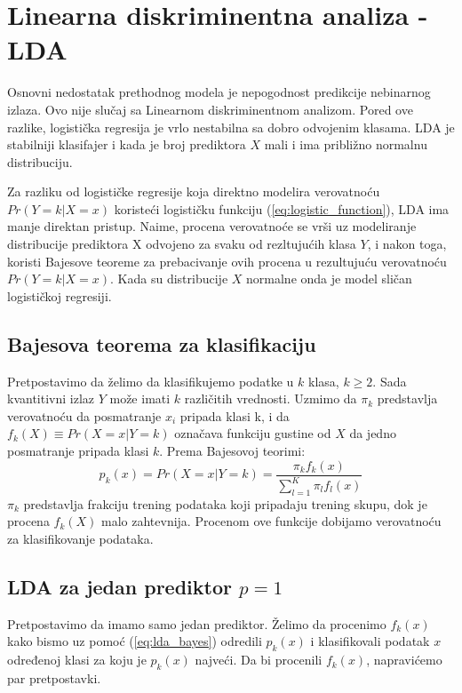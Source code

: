 \section{Linearna diskriminentna analiza - LDA}
Osnovni nedostatak prethodnog modela je nepogodnost predikcije nebinarnog izlaza.
Ovo nije slučaj sa Linearnom diskriminentnom analizom. Pored ove razlike,
logistička regresija je vrlo nestabilna sa dobro odvojenim klasama. LDA je
stabilniji klasifajer i kada je broj prediktora $X$ mali i ima približno normalnu
distribuciju.

Za razliku od logističke regresije koja direktno modelira verovatnoću $Pr\left(Y=k | X = x\right)$
koristeći logističku funkciju (\ref{eq:logistic_function}), LDA ima manje
direktan pristup. Naime, procena
verovatnoće se vrši uz modeliranje distribucije prediktora X odvojeno za svaku
od rezltujućih klasa $Y$, i nakon toga, koristi Bajesove teoreme za
prebacivanje ovih procena u rezultujuću verovatnoću $Pr\left(Y=k | X = x\right)$.
Kada su distribucije $X$ normalne onda je model sličan logističkoj regresiji.

\subsection{Bajesova teorema za klasifikaciju}
Pretpostavimo da želimo da klasifikujemo podatke u $k$ klasa, $k \geq 2$. Sada
kvantitivni izlaz $Y$ može imati $k$ različitih vrednosti. Uzmimo da $\pi_k$
predstavlja verovatnoću da posmatranje $x_i$ pripada klasi k, i da
$f_k\left(X\right) \equiv Pr\left(X=x | Y=k\right)$ označava funkciju gustine
od $X$ da jedno posmatranje pripada klasi $k$. Prema Bajesovoj teorimi:
\begin{equation} \label{eq:lda_bayes}
  p_k\left(x\right) = Pr(X=x | Y=k) =
  \frac
    {\pi_k f_k\left(x\right)}
    {\sum_{l=1}^{K}\pi_l f_l\left(x\right)}
\end{equation}
$\pi_k$ predstavlja frakciju trening podataka koji pripadaju trening skupu, dok
je procena $f_k\left(X\right)$ malo zahtevnija. Procenom ove funkcije dobijamo
verovatnoću za klasifikovanje podataka.

\subsection{LDA za jedan prediktor $p = 1$}
Pretpostavimo da imamo samo jedan prediktor. Želimo da procenimo
$f_k\left(x\right)$ kako bismo uz pomoć (\ref{eq:lda_bayes}) odredili
$p_k\left(x\right)$ i klasifikovali podatak $x$ određenoj klasi za koju je
$p_k\left(x\right)$ najveći. Da bi procenili $f_k\left(x\right)$,
napravićemo par pretpostavki.

